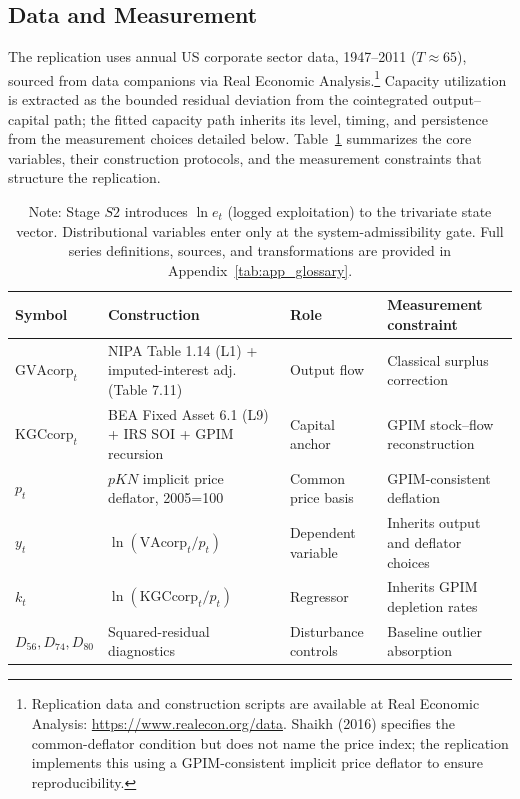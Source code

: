 \documentclass[11pt]{article}
\begin{document}
\subsection{Data and Measurement}
\label{subsec:data_measurement}

The replication uses annual US corporate sector data, 1947--2011 ($T \approx 65$), sourced from \citet{Shaikh2016} data companions via Real Economic Analysis.\footnote{Replication data and construction scripts are available at Real Economic Analysis: \url{https://www.realecon.org/data}. Shaikh (2016) specifies the common-deflator condition but does not name the price index; the replication implements this using a GPIM-consistent implicit price deflator to ensure reproducibility.} Capacity utilization is extracted as the bounded residual deviation from the cointegrated output--capital path; the fitted capacity path inherits its level, timing, and persistence from the measurement choices detailed below. Table~\ref{tab:variables_replication} summarizes the core variables, their construction protocols, and the measurement constraints that structure the replication.

\begin{table}[h!]
\centering
\caption{Core replication variables: symbols, sources, and transformations}
\label{tab:variables_replication}
\small
\begin{tabular}{@{}>{\raggedright\arraybackslash}p{2.8cm}>{\raggedright\arraybackslash}p{4.5cm}>{\raggedright\arraybackslash}p{2.2cm}>{\raggedright\arraybackslash}p{3.2cm}@{}}
\toprule
Symbol & Construction & Role & Measurement constraint \\
\midrule
$\text{GVAcorp}_t$ & NIPA Table 1.14 (L1) + imputed-interest adj. (Table 7.11) & Output flow & Classical surplus correction \\
$\text{KGCcorp}_t$ & BEA Fixed Asset 6.1 (L9) + IRS SOI + GPIM recursion & Capital anchor & GPIM stock--flow reconstruction \\
$p_t$ & $pKN$ implicit price deflator, 2005=100 & Common price basis & GPIM-consistent deflation \\
$y_t$ & $\ln(\text{VAcorp}_t/p_t)$ & Dependent variable & Inherits output and deflator choices \\
$k_t$ & $\ln(\text{KGCcorp}_t/p_t)$ & Regressor & Inherits GPIM depletion rates \\
$D_{56},D_{74},D_{80}$ & Squared-residual diagnostics  & Disturbance controls & Baseline outlier absorption \\
\bottomrule
\end{tabular}
\caption*{Note: Stage $S2$ introduces $\ln e_t$ (logged exploitation) to the trivariate state vector. Distributional variables enter only at the system-admissibility gate. Full series definitions, sources, and transformations are provided in Appendix~\ref{tab:app_glossary}.}
\end{table}
\end{document}
